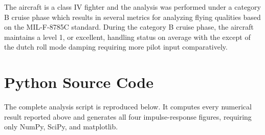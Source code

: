 \documentclass[11pt]{article}
\begin{document}
The aircraft is a class IV fighter and the analysis was performed under a category B cruise phase which results in
several metrics for analyzing flying qualities based on the MIL-F-8785C standard.
During the category B cruise phase, the aircraft maintains a level 1, or excellent, handling status on average with the
except of the dutch roll mode damping requiring more pilot input comparatively.

\clearpage

\appendix
{}

\section{Python Source Code}

The complete analysis script is reproduced below.
It computes every numerical result reported above and generates all four
impulse-response figures, requiring only NumPy, SciPy, and matplotlib.


\end{document}
